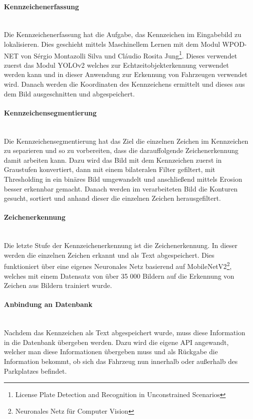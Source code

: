 \paragraph{Kennzeichenerfassung}\mbox{}\\
Die Kennzeichenerfassung hat die Aufgabe, das Kennzeichen im Eingabebild zu lokalisieren. Dies geschieht mittels Maschinellem Lernen 
mit dem Modul WPOD-NET von Sérgio Montazolli Silva und Cláudio Rosita Jung\footnote{License Plate Detection and Recognition in Unconstrained Scenarios}. Dieses verwendet zuerst das Modul YOLOv2 welches zur 
Echtzeitobjekterkennung verwendet werden kann und in dieser Anwendung zur Erkennung von Fahrzeugen verwendet wird. Danach werden 
die Koordinaten des Kennzeichens ermittelt und dieses aus dem Bild ausgeschnitten und abgespeichert.

\paragraph{Kennzeichensegmentierung}\mbox{}\\
Die Kennzeichensegmentierung hat das Ziel die einzelnen Zeichen im Kennzeichen zu separieren und so zu vorbereiten, dass die 
darauffolgende Zeichenerkennung damit arbeiten kann. Dazu wird das Bild mit dem Kennzeichen zuerst in Graustufen konvertiert, 
dann mit einem bilateralen Filter gefiltert, mit Thresholding in ein binäres Bild umgewandelt und anschließend mittels Erosion 
besser erkennbar gemacht. Danach werden im verarbeiteten Bild die Konturen gesucht, sortiert und anhand dieser die einzelnen Zeichen herausgefiltert.

\paragraph{Zeichenerkennung}\mbox{}\\
Die letzte Stufe der Kennzeichenerkennung ist die Zeichenerkennung. In dieser werden die einzelnen Zeichen erkannt und als Text 
abgespeichert. Dies funktioniert über eine eigenes Neuronales Netz basierend auf MobileNetV2\footnote{Neuronales Netz für Computer Vision}, welches mit einem Datensatz von 
über 35 000 Bildern auf die Erkennung von Zeichen aus Bildern trainiert wurde.

\paragraph{Anbindung an Datenbank}\mbox{}\\
Nachdem das Kennzeichen als Text abgespeichert wurde, muss diese Information in die Datenbank übergeben werden. Dazu wird die 
eigene API angewandt, welcher man diese Informationen übergeben muss und als Rückgabe die Information bekommt, ob sich das 
Fahrzeug nun innerhalb oder außerhalb des Parkplatzes befindet.

